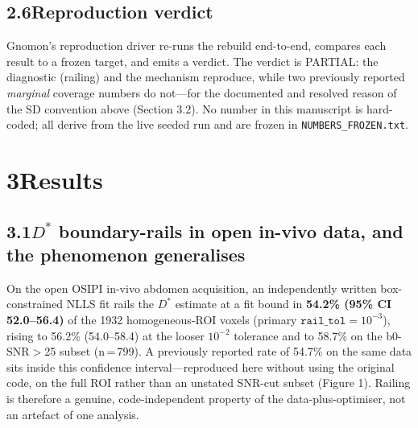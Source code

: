 \documentclass[11pt]{article}
\newcommand{\Dstar}{\ensuremath{D^{*}}}
\begin{document}
\subsection*{2.6\quad Reproduction verdict}

Gnomon's reproduction driver re-runs the rebuild end-to-end, compares each result to a
frozen target, and emits a verdict. The verdict is PARTIAL: the diagnostic (railing) and
the mechanism reproduce, while two previously reported \emph{marginal} coverage numbers
do not---for the documented and resolved reason of the SD convention above (Section 3.2).
No number in this manuscript is hard-coded; all derive from the live seeded run and are
frozen in \texttt{NUMBERS\_FROZEN.txt}.

\section*{3\quad Results}

\subsection*{3.1\quad \Dstar{} boundary-rails in open in-vivo data, and the phenomenon generalises}

On the open OSIPI in-vivo abdomen acquisition, an independently written box-constrained
NLLS fit rails the \Dstar{} estimate at a fit bound in \textbf{54.2\% (95\% CI
52.0--56.4)} of the 1932 homogeneous-ROI voxels (primary $\texttt{rail\_tol}=10^{-3}$),
rising to 56.2\% (54.0--58.4) at the looser $10^{-2}$ tolerance and to 58.7\% on the
b0-SNR$>$25 subset (n\,=\,799). A previously reported rate of 54.7\% on the same data
sits inside this confidence interval---reproduced here without using the original code,
on the full ROI rather than an unstated SNR-cut subset (Figure 1). Railing is therefore a
genuine, code-independent property of the data-plus-optimiser, not an artefact of one
analysis.
\end{document}

